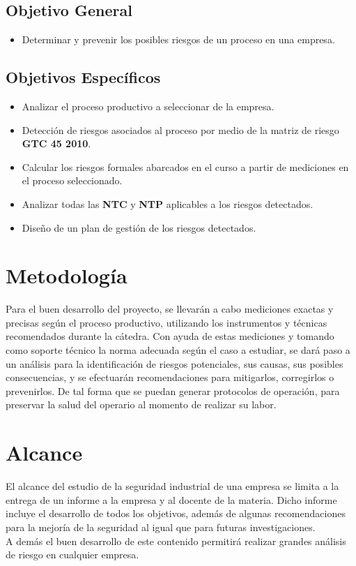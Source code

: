 \documentclass[11pt,graphicx,caption,rotating]{article}
\begin{document}
\subsection{Objetivo General}
\begin{itemize}
 \item Determinar y prevenir los posibles riesgos de un proceso en una empresa.
\end{itemize}

\subsection{Objetivos Específicos}
\begin{itemize}
 \item Analizar el proceso productivo a seleccionar de la empresa.
 \item Detección de riesgos asociados al proceso por medio de la matriz de riesgo \textbf{GTC 45 2010}.
 \item Calcular los riesgos formales abarcados en el curso a partir de mediciones en el proceso seleccionado.
 \item Analizar todas las \textbf{NTC} y \textbf{NTP} aplicables a los riesgos detectados.
 \item Diseño de un plan de gestión de los riesgos detectados.
\end{itemize}

\section{Metodología}
\noindent
Para el buen desarrollo del proyecto, se llevarán a cabo mediciones exactas y precisas según el proceso productivo, utilizando los instrumentos  y técnicas recomendados durante la cátedra. Con ayuda de estas mediciones y tomando como soporte técnico la norma adecuada según el caso a estudiar, se dará paso a un análisis para la identificación de riesgos potenciales, sus causas, sus posibles consecuencias, y se efectuarán recomendaciones para mitigarlos, corregirlos o prevenirlos. De tal forma que se puedan generar protocolos de operación, para preservar la salud del operario al momento de realizar su labor.

\section{Alcance}
\noindent
El alcance del estudio de la seguridad industrial de una empresa se limita a la entrega de un informe a la empresa y al docente de la materia. Dicho informe incluye el desarrollo de todos los objetivos, además de algunas recomendaciones para la mejoría de la seguridad al igual que para futuras investigaciones.\\
A demás el buen desarrollo de este contenido permitirá realizar grandes análisis de riesgo en cualquier empresa.
\end{document}
